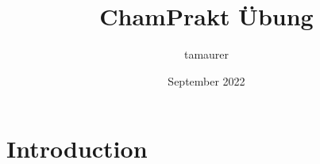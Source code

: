 \documentclass{article}
\title{ChamPrakt Übung}
\author{tamaurer }
\date{September 2022}
\begin{document}
\maketitle

\section{Introduction}
\end{document}
